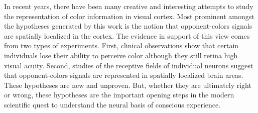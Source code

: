 In recent years, there have been many creative and interesting
attempts to study the representation of color information in visual
cortex.  Most prominent amongst the hypotheses generated by this work
is the notion that opponent-colors signals are spatially localized in
the cortex.  The evidence in support of this view comes from two types
of experiments.  First, clinical observations show that certain
individuals lose their ability to perceive color although they still
retina high visual acuity. Second, studies of the receptive fields of
individual neurons suggest that opponent-colors signals are
represented in spatially localized brain areas.  These hypotheses are
new and unproven.  But, whether they are ultimately right or wrong,
these hypotheses are the important opening steps in the modern
scientific quest to understand the neural basis of conscious
experience.



